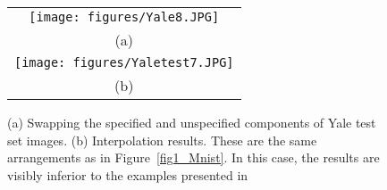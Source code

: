 \documentclass[10pt,twocolumn,letterpaper]{article}
\begin{document}
\begin{figure}[t]
  \centering
    \begin{tabular}{c}
    \texttt{[image: figures/Yale8.JPG]}\\(a)\\
  \texttt{[image: figures/Yaletest7.JPG]}\\
    (b)\\
    \end{tabular}
  \caption{\label{fig5_yale} (a) Swapping the specified and unspecified components of Yale test set images. (b) Interpolation results. These are the same arrangements as in Figure~\ref{fig1_Mnist}. In this case, the results are visibly inferior to the examples presented in~\cite{disentanglement}}
\end{figure}



\end{document}
